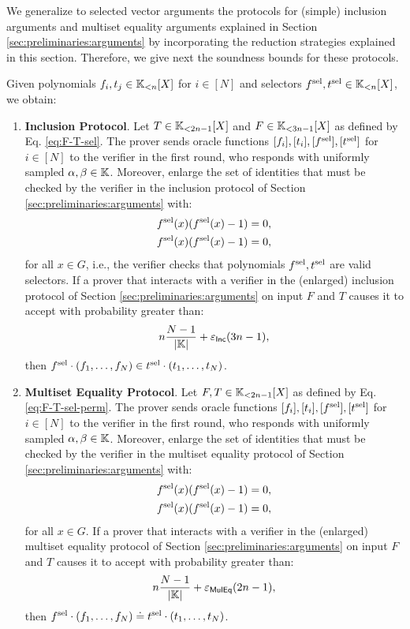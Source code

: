 We generalize to selected vector arguments the protocols for (simple) inclusion arguments and multiset equality arguments explained in Section \ref{sec:preliminaries:arguments} by incorporating the reduction strategies explained in this section. Therefore, we give next the soundness bounds for these protocols.
\begin{lemma}\label{thm:sound-bound}
  Given polynomials $f_i,t_j \in \mathbb{K}_{<n}[X]$ for $i\in[N]$ and selectors $f^{\text{sel}},t^{\text{sel}} \in \mathbb{K}_{<n}[X]$, we obtain:
  \begin{enumerate}
    \item \textbf{Inclusion Protocol}. Let $T \in \mathbb{K}_{<2n-1}[X]$ and $F \in \mathbb{K}_{<3n-1}[X]$ as defined by Eq. \eqref{eq:F-T-sel}. The prover sends oracle functions $[f_{i}],[t_{i}],[f^{\text{sel}}],[t^{\text{sel}}]$ for $i\in[N]$ to the verifier in the first round, who responds with uniformly sampled $\alpha,\beta \in \mathbb{K}$. Moreover, enlarge the set of identities that must be checked by the verifier in the inclusion protocol of Section \ref{sec:preliminaries:arguments} with:
    \begin{align*}
      f^{\text{sel}}(x)(f^{\text{sel}}(x) - 1) = 0, \\
      f^{\text{sel}}(x)(f^{\text{sel}}(x) - 1) = 0,
    \end{align*}
    for all $x \in G$, i.e., the verifier checks that polynomials $f^{\text{sel}},t^{\text{sel}}$ are valid selectors. If a prover that interacts with a verifier in the (enlarged) inclusion protocol of Section \ref{sec:preliminaries:arguments} on input $F$ and $T$ causes it to accept with probability greater than:
    \[
      n\frac{N-1}{|\mathbb{K}|} + \varepsilon_{\textsf{Inc}}(3n-1),
    \]
    then $f^{\text{sel}} \cdot (f_1,\dots,f_N) \in t^{\text{sel}} \cdot (t_1,\dots,t_N)$.

    \item \textbf{Multiset Equality Protocol}. Let $F,T \in \mathbb{K}_{<2n-1}[X]$ as defined by Eq. \eqref{eq:F-T-sel-perm}. The prover sends oracle functions $[f_{i}],[t_{i}],[f^{\text{sel}}],[t^{\text{sel}}]$ for $i\in[N]$ to the verifier in the first round, who responds with uniformly sampled $\alpha,\beta \in \mathbb{K}$. Moreover, enlarge the set of identities that must be checked by the verifier in the multiset equality protocol of Section \ref{sec:preliminaries:arguments} with:
    \begin{align*}
      f^{\text{sel}}(x)(f^{\text{sel}}(x) - 1) = 0, \\
      f^{\text{sel}}(x)(f^{\text{sel}}(x) - 1) = 0,
    \end{align*}
    for all $x \in G$. If a prover that interacts with a verifier in the (enlarged) multiset equality protocol of Section \ref{sec:preliminaries:arguments} on input $F$ and $T$ causes it to accept with probability greater than:
    \[
     n\frac{N-1}{|\mathbb{K}|} + \varepsilon_{\textsf{MulEq}}(2n-1),
    \]
    then $f^{\text{sel}} \cdot (f_1,\dots,f_N) \doteq t^{\text{sel}} \cdot (t_1,\dots,t_N)$.
  \end{enumerate} 
\end{lemma}


